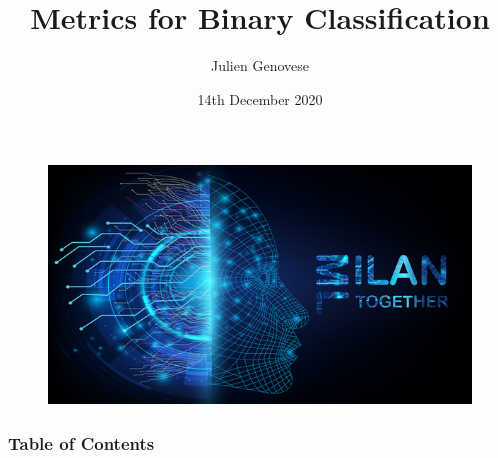 \documentclass[9pt]{beamer}
\title{Metrics for Binary Classification}
\author{Julien Genovese}
\institute{Machine Learning Together Milan}
\date{14th December 2020}
\begin{document}
\begin{frame}
\maketitle
\begin{figure}[ht]
\includegraphics[scale=0.25]{images/MLTM.jpeg}
\quad
\end{figure}
\end{frame}

\begin{frame}
\frametitle{Table of Contents}
\tableofcontents
\end{frame}
\end{document}
